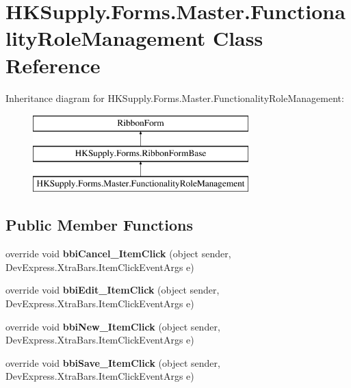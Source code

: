 \hypertarget{class_h_k_supply_1_1_forms_1_1_master_1_1_functionality_role_management}{}\section{H\+K\+Supply.\+Forms.\+Master.\+Functionality\+Role\+Management Class Reference}
\label{class_h_k_supply_1_1_forms_1_1_master_1_1_functionality_role_management}
Inheritance diagram for H\+K\+Supply.\+Forms.\+Master.\+Functionality\+Role\+Management\+:\begin{figure}[H]
\begin{center}
\leavevmode
\includegraphics[height=3.000000cm]{class_h_k_supply_1_1_forms_1_1_master_1_1_functionality_role_management}
\end{center}
\end{figure}
\subsection*{Public Member Functions}
\begin{DoxyCompactItemize}
\item 
\mbox{\label{class_h_k_supply_1_1_forms_1_1_master_1_1_functionality_role_management_ab51c729f893a5446092c9c30f9b4eda2}} 
override void {\bfseries bbi\+Cancel\+\_\+\+Item\+Click} (object sender, Dev\+Express.\+Xtra\+Bars.\+Item\+Click\+Event\+Args e)
\item 
\mbox{\label{class_h_k_supply_1_1_forms_1_1_master_1_1_functionality_role_management_af427e1e65b515e49b2c640e58dbab06e}} 
override void {\bfseries bbi\+Edit\+\_\+\+Item\+Click} (object sender, Dev\+Express.\+Xtra\+Bars.\+Item\+Click\+Event\+Args e)
\item 
\mbox{\label{class_h_k_supply_1_1_forms_1_1_master_1_1_functionality_role_management_a4e021245b86844bb5bbc8c6874c2d6a8}} 
override void {\bfseries bbi\+New\+\_\+\+Item\+Click} (object sender, Dev\+Express.\+Xtra\+Bars.\+Item\+Click\+Event\+Args e)
\item 
\mbox{\label{class_h_k_supply_1_1_forms_1_1_master_1_1_functionality_role_management_a22422239d3b84823861978cb7d1892cb}} 
override void {\bfseries bbi\+Save\+\_\+\+Item\+Click} (object sender, Dev\+Express.\+Xtra\+Bars.\+Item\+Click\+Event\+Args e)
\end{DoxyCompactItemize}
